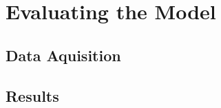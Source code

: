 \documentclass[main.tex]{subfiles}
\begin{document}
  \section{Evaluating the Model}
    \subsection{Data Aquisition}
      \lipsum[7]
    \subsection{Results}
      \lipsum[8]
\end{document}
